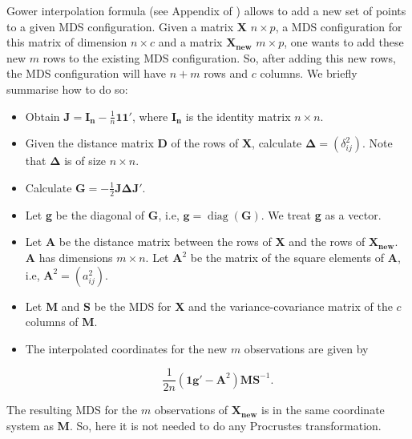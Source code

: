 \documentclass[11pt]{report}
\DeclareMathOperator{\diag}{diag}
\begin{document}
Gower interpolation formula (see Appendix of \cite{gowerformula}) allows to add 
a new set of points to a given MDS configuration. Given a matrix 
\textbf{X} $n \times p$, a MDS configuration for this matrix of dimension 
$n \times c$ and a matrix $\mathbf{X_{new}}$ $m \times p$, one wants to 
add these new $m$ rows to the existing MDS configuration. So, 
after adding this new rows, the MDS configuration will have $n+m$ rows and 
$c$ columns. We briefly summarise how to do so:

\begin{itemize}

\item Obtain $\mathbf{J} = \mathbf{I_n} - \frac{1}{n}\mathbf{1}\mathbf{1}'$,
where $\mathbf{I_n}$ is the identity matrix $n \times n$.

\item Given the distance matrix \textbf{D} of the rows of \textbf{X},
calculate $\mathbf{\Delta} = (\delta_{ij}^2)$. Note that $\mathbf{\Delta}$ is 
of size $n \times n$.

\item Calculate $\mathbf{G} = - \frac{1}{2} \mathbf{J} \mathbf{\Delta} \mathbf{J}'$.

\item Let \textbf{g} be the diagonal of \textbf{G}, i.e, 
$\mathbf{g} = \diag({\mathbf{G}})$. We treat \textbf{g} as a vector. 

\item Let \textbf{A} be the distance matrix between the rows of 
\textbf{X} and the rows of $\mathbf{X_{new}}$. \textbf{A} has dimensions 
$m \times n$. Let $\mathbf{A}^2$ be the matrix of the square elements 
of \textbf{A}, i.e, $\mathbf{A}^2 = (a_{ij}^2)$.

\item Let \textbf{M} and \textbf{S} be the MDS for \textbf{X} and the 
variance-covariance matrix of the $c$ columns of \textbf{M}.

\item The interpolated coordinates for the new $m$ observations are given by

\begin{equation} \label{gower_f}
\frac{1}{2n} (\mathbf{1}\mathbf{g}' - \mathbf{A}^2) \mathbf{M}\mathbf{S}^{-1}.
\end{equation}

\end{itemize}

The resulting MDS for the $m$ observations of $\mathbf{X_{new}}$ is in the same
coordinate system as \textbf{M}. So, here it is not needed to do any 
Procrustes transformation.
\end{document}
